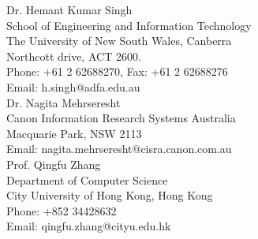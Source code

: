 \documentclass[10pt]{article}
\begin{document}
Dr. Hemant Kumar Singh \\ 
School of Engineering and Information Technology \\
The University of New South Wales, Canberra \\
Northcott drive, ACT 2600.\\ 
Phone: +61 2 62688270, Fax: +61 2 62688276\\ 
Email: h.singh@adfa.edu.au\\

Dr. Nagita Mehrseresht\\
Canon Information Research Systems Australia\\
Macquarie Park, NSW 2113\\
Email: nagita.mehrseresht@cisra.canon.com.au\\ 

Prof. Qingfu Zhang\\
Department of Computer Science\\
City University of Hong Kong, Hong Kong \\
Phone: +852 34428632 \\
Email: qingfu.zhang@cityu.edu.hk 
\end{document}
